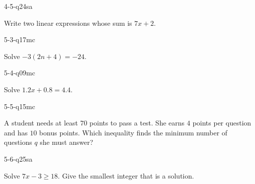 \begin{practiceQuestion}{4-5-q24}{sa}
\begin{questionText}
Write two linear expressions whose sum is $7x + 2$.
\end{questionText}
\end{practiceQuestion}

\begin{practiceQuestion}{5-3-q17}{mc}
\begin{questionText}
Solve $-3(2n + 4) = -24$.
\end{questionText}
\end{practiceQuestion}

\begin{practiceQuestion}{5-4-q09}{mc}
\begin{questionText}
Solve $1.2x + 0.8 = 4.4$.
\end{questionText}
\end{practiceQuestion}

\begin{practiceQuestion}{5-5-q15}{mc}
\begin{questionText}
A student needs at least $70$ points to pass a test. She earns $4$ points per question and has $10$ bonus points. Which inequality finds the minimum number of questions $q$ she must answer?
\end{questionText}
\end{practiceQuestion}

\begin{practiceQuestion}{5-6-q25}{sa}
\begin{questionText}
Solve $7x - 3 \geq 18$. Give the smallest integer that is a solution.
\end{questionText}
\end{practiceQuestion}

